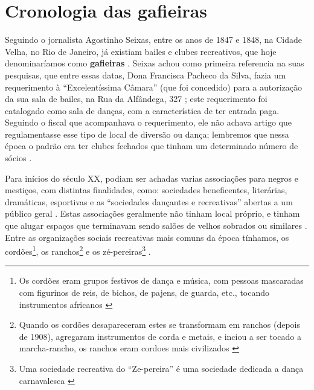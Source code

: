 \section{Cronologia das gafieiras}



Seguindo o jornalista Agostinho Seixas,
entre os anos de 1847 e 1848, na Cidade Velha, no Rio de Janeiro,
já existiam  bailes e clubes recreativos, 
que hoje denominaríamos como \textbf{gafieiras} \cite[pp. 11]{respeitojournalbrasil1}.
Seixas achou como primeira referencia na suas pesquisas, que entre essas datas,
Dona Francisca Pacheco da Silva, fazia um requerimento 
à ``Excelentíssima Câmara'' (que foi concedido) para a autorização 
da sua sala de bailes, na Rua da Alfândega, 327 \cite[pp. 11]{respeitojournalbrasil1} \cite[pp. 71]{perna2002samba};
este requerimento foi catalogado como sala de danças, 
com a característica de ter entrada paga.
Seguindo o fiscal que acompanhava o requerimento,
ele não achava artigo que regulamentasse esse tipo de local 
de diversão ou dança; lembremos que nessa época
o padrão era ter clubes fechados que tinham um determinado número de sócios \cite[pp. 11,12]{respeitojournalbrasil1}.





Para inícios do século XX, podiam ser achadas varias associações para negros e mestiços, 
com distintas  finalidades, como: sociedades beneficentes, literárias, dramáticas, esportivas 
e as ``sociedades dançantes e recreativas'' abertas a um público geral
\cite[pp. 154-155]{neres1999negro} \cite[pp. 71]{de2008bexiga}.
Estas associações geralmente não tinham local próprio, 
e tinham que alugar espaços que terminavam sendo salões de velhos sobrados
ou similares \cite[pp. 154-155]{neres1999negro} \cite[pp. 49]{diniz2003almanaque}.
Entre as organizações sociais recreativas mais comuns da época tínhamos, 
os cordões\footnote{Os cordões eram grupos festivos de dança e música, 
com pessoas mascaradas com figurinos de reis, de
bichos, de pajens, de guarda, etc., tocando instrumentos africanos \cite[pp. 23-24]{fernandes2001escolas}},
os ranchos\footnote{Quando os cordões desapareceram estes se transformam em ranchos (depois de 1908), 
agregaram instrumentos de corda e metais, e inciou a ser tocado a marcha-rancho,
os ranchos eram cordoes mais civilizados \cite[pp. 24]{fernandes2001escolas}} 
e os zé-pereiras\footnote{ Uma sociedade recreativa do ``Ze-pereira''
é uma sociedade dedicada a dança carnavalesca \cite[pp. 10]{simoesjournalbrasil1}} 
\cite[pp. 10]{simoesjournalbrasil1}.



